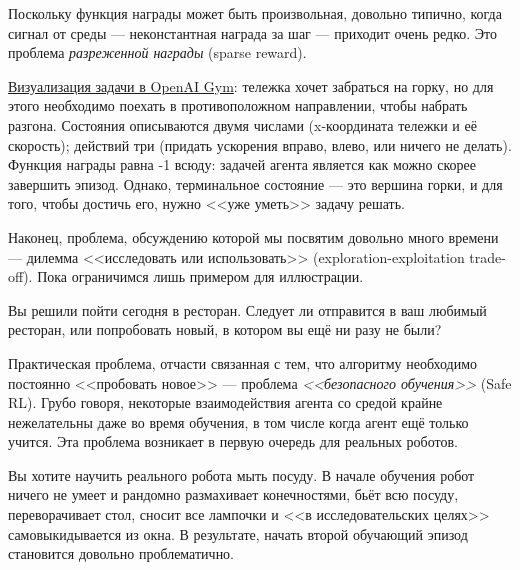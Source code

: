 Поскольку функция награды может быть произвольная, довольно типично, когда сигнал от среды --- неконстантная награда за шаг --- приходит очень редко. Это проблема \emph{разреженной награды} (sparse reward).

\begin{example}
\href{https://gym.openai.com/envs/MountainCar-v0/}{Визуализация задачи в OpenAI Gym}: тележка хочет забраться на горку, но для этого необходимо поехать в противоположном направлении, чтобы набрать разгона. Состояния описываются двумя числами (x-координата тележки и её скорость); действий три (придать ускорения вправо, влево, или ничего не делать). Функция награды равна -1 всюду: задачей агента является как можно скорее завершить эпизод. Однако, терминальное состояние --- это вершина горки, и для того, чтобы достичь его, нужно <<уже уметь>> задачу решать.  
\end{example}

Наконец, проблема, обсуждению которой мы посвятим довольно много времени --- дилемма <<исследовать или использовать>> (exploration-exploitation trade-off). Пока ограничимся лишь примером для иллюстрации.

\begin{example}
Вы решили пойти сегодня в ресторан. Следует ли отправится в ваш любимый ресторан, или попробовать новый, в котором вы ещё ни разу не были?
\end{example}

Практическая проблема, отчасти связанная с тем, что алгоритму необходимо постоянно <<пробовать новое>> --- проблема \emph{<<безопасного обучения>>} (Safe RL). Грубо говоря, некоторые взаимодействия агента со средой крайне нежелательны даже во время обучения, в том числе когда агент ещё только учится. Эта проблема возникает в первую очередь для реальных роботов.

\begin{example}
Вы хотите научить реального робота мыть посуду. В начале обучения робот ничего не умеет и рандомно размахивает конечностями, бьёт всю посуду, переворачивает стол, сносит все лампочки и <<в исследовательских целях>> самовыкидывается из окна. В результате, начать второй обучающий эпизод становится довольно проблематично.
\end{example}

